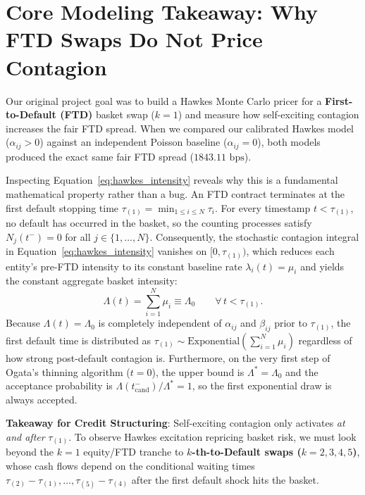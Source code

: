 \documentclass[11pt,a4paper]{article}
\begin{document}
\section{Core Modeling Takeaway: Why FTD Swaps Do Not Price Contagion}

Our original project goal was to build a Hawkes Monte Carlo pricer for a \textbf{First-to-Default (FTD)} basket swap ($k=1$) and measure how self-exciting contagion increases the fair FTD spread. When we compared our calibrated Hawkes model ($\alpha_{ij} > 0$) against an independent Poisson baseline ($\alpha_{ij} = 0$), both models produced the exact same fair FTD spread ($1843.11\text{ bps}$).

Inspecting Equation~\eqref{eq:hawkes_intensity} reveals why this is a fundamental mathematical property rather than a bug. An FTD contract terminates at the first default stopping time $\tau_{(1)} = \min_{1 \le i \le N} \tau_i$. For every timestamp $t < \tau_{(1)}$, no default has occurred in the basket, so the counting processes satisfy $N_j(t^-) = 0$ for all $j \in \{1, \dots, N\}$. Consequently, the stochastic contagion integral in Equation~\eqref{eq:hawkes_intensity} vanishes on $[0, \tau_{(1)})$, which reduces each entity's pre-FTD intensity to its constant baseline rate $\lambda_i(t) = \mu_i$ and yields the constant aggregate basket intensity:
\begin{equation}
  \Lambda(t) = \sum_{i=1}^{N} \mu_i \equiv \Lambda_0 \qquad \forall \, t < \tau_{(1)}.
  \label{eq:ftd_invariance}
\end{equation}
Because $\Lambda(t) = \Lambda_0$ is completely independent of $\alpha_{ij}$ and $\beta_{ij}$ prior to $\tau_{(1)}$, the first default time is distributed as $\tau_{(1)} \sim \mathrm{Exponential}\!\left(\sum_{i=1}^N \mu_i\right)$ regardless of how strong post-default contagion is. Furthermore, on the very first step of Ogata's thinning algorithm ($t=0$), the upper bound is $\Lambda^* = \Lambda_0$ and the acceptance probability is $\Lambda(t_{\text{cand}}^-) / \Lambda^* = 1$, so the first exponential draw is always accepted.

\textbf{Takeaway for Credit Structuring}: Self-exciting contagion only activates \emph{at and after} $\tau_{(1)}$. To observe Hawkes excitation repricing basket risk, we must look beyond the $k=1$ equity/FTD tranche to \textbf{$k$-th-to-Default swaps ($k = 2, 3, 4, 5$)}, whose cash flows depend on the conditional waiting times $\tau_{(2)} - \tau_{(1)}, \dots, \tau_{(5)} - \tau_{(4)}$ after the first default shock hits the basket.
\end{document}
